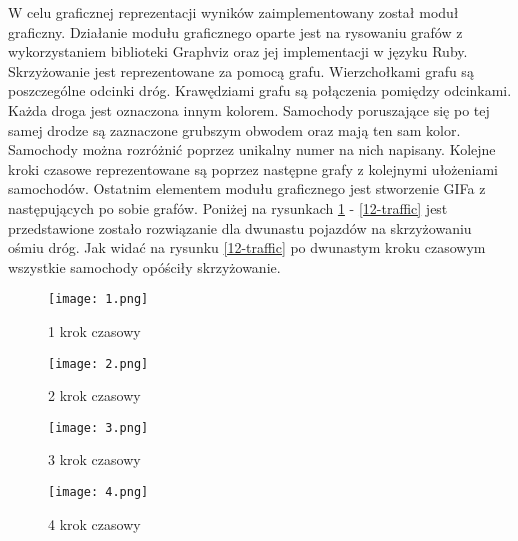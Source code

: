 W celu graficznej reprezentacji wyników zaimplementowany został moduł graficzny.
\newline
\newline
Działanie modułu graficznego oparte jest na rysowaniu grafów z wykorzystaniem biblioteki Graphviz oraz jej implementacji w języku Ruby.
\newline
\newline
Skrzyżowanie jest reprezentowane za pomocą grafu. Wierzchołkami grafu są poszczególne odcinki dróg. Krawędziami grafu są połączenia pomiędzy odcinkami.
\newline
\newline
Każda droga jest oznaczona innym kolorem.
\newline
\newline
Samochody poruszające się po tej samej drodze są zaznaczone grubszym obwodem oraz mają ten sam kolor. Samochody można rozróżnić poprzez unikalny numer na nich napisany.
\newline
\newline
Kolejne kroki czasowe reprezentowane są poprzez następne grafy z kolejnymi ułożeniami samochodów.
\newline
\newline
Ostatnim elementem modułu graficznego jest stworzenie GIFa z następujących po sobie grafów.
\newline
\newline
Poniżej na rysunkach \ref{1-traffic} - \ref{12-traffic} jest przedstawione zostało rozwiązanie dla dwunastu pojazdów na skrzyżowaniu ośmiu dróg.
\newline
Jak widać na rysunku \ref{12-traffic} po dwunastym kroku czasowym wszystkie samochody opóściły skrzyżowanie.
\newpage
\begin{figure}
    \texttt{[image: 1.png]}
  \caption{1 krok czasowy}
  \label{1-traffic}
\end{figure}
\newpage
\begin{figure}
    \texttt{[image: 2.png]}
  \caption{2 krok czasowy}
  \label{2-traffic}
\end{figure}
\newpage
\begin{figure}
    \texttt{[image: 3.png]}
  \caption{3 krok czasowy}
  \label{3-traffic}
\end{figure}
\newpage
\begin{figure}
    \texttt{[image: 4.png]}
  \caption{4 krok czasowy}
  \label{4-traffic}
\end{figure}
